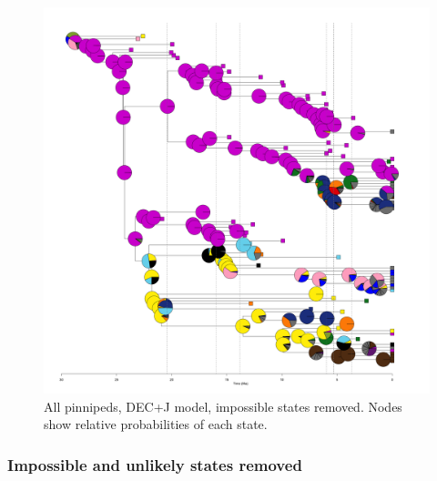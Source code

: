 \documentclass[a4paper, 12pt]{article}
\begin{document}
\begin{figure}[H]
 \centering
  \includegraphics[width = \linewidth]{figures/all-pinnipeds-DECj-impossible-pies.png}
  \caption{All pinnipeds, DEC+J model, impossible states removed. Nodes show relative probabilities of each state.}
  \label{fig-all-decj-pie}
\end{figure} 
 

\subsubsection{Impossible and unlikely states removed}
\end{document}
